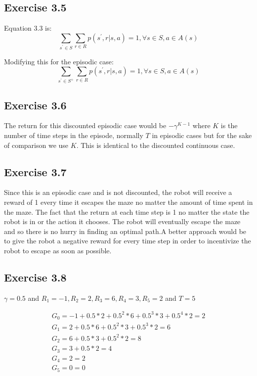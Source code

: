 \subsection{Exercise 3.5}
Equation 3.3 is:
\begin{equation}
  \sum_ {s^\prime \in S} \sum_{r \in R} p(s^\prime, r | s,a) = 1, \forall s \in S, a \in A(s)
\end{equation}

Modifying this for the episodic case:
\begin{equation}
  \sum_ {s^\prime \in S^+} \sum_{r \in R} p(s^\prime, r | s,a) = 1, \forall s \in S, a \in A(s)
\end{equation}

\subsection{Exercise 3.6}
The return for this discounted episodic case would be $-\gamma^{K-1}$ where $K$ is the number of time steps in the episode, normally $T$ in episodic cases but for the sake of comparison we use $K$. This is identical to the discounted continuous case.

\subsection{Exercise 3.7}
Since this is an episodic case and is not discounted, the robot will receive a reward of 1 every time it escapes the maze no matter the amount of time spent in the maze. The fact that the return at each time step is 1 no matter the state the robot is in or the action it chooses. The robot will eventually escape the maze and so there is no hurry in finding an optimal path.A better approach would be to give the robot a negative reward for every time step in order to incentivize the robot to escape as soon as possible.

\subsection{Exercise 3.8}
$\gamma = 0.5$ and $ R_1=-1, R_2=2, R_3=6, R_4=3, R_5=2$ and $T=5$

\begin{gather}
  G_0 = -1 + 0.5*2 + 0.5^2 * 6 + 0.5^3 * 3 + 0.5^4*2 = 2 \\
  G_1 = 2 + 0.5 * 6 + 0.5^2 * 3 + 0.5^3*2 = 6 \\
  G_2 = 6 + 0.5 * 3 + 0.5^2*2 = 8 \\
  G_3 = 3 + 0.5*2 = 4 \\
  G_4 = 2 = 2 \\
  G_5 = 0 = 0
\end{gather}

